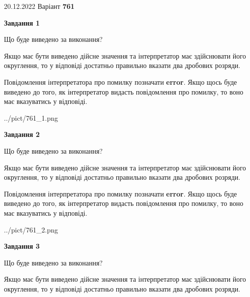 \documentclass[12pt, ukrainian]{article}
\begin{document}
{20.12.2022 Варіант \No \textbf { 761 }\par}
{
\begin {Large}

{\begin {center}\textbf{Завдання 1}\end {center}}\par
Що буде виведено за виконання? \par

Якщо має бути виведено дійсне значення та інтерпретатор має здійснювати його округлення, 
то у відповіді достатньо правильно вказати два дробових розряди.

Повідомлення інтерпретатора про помилку позначати \textbf{error}.
Якщо щось буде виведено до того, як інтерпретатор видасть повідомлення про помилку, 
то воно має вказуватись у відповіді. \par

\begin{center}
	{../pict/761_1.png}
\end{center}
\newpage

{\begin {center}\textbf{Завдання 2}\end {center}}\par
Що буде виведено за виконання? \par

Якщо має бути виведено дійсне значення та інтерпретатор має здійснювати його округлення, 
то у відповіді достатньо правильно вказати два дробових розряди.

Повідомлення інтерпретатора про помилку позначати \textbf{error}.
Якщо щось буде виведено до того, як інтерпретатор видасть повідомлення про помилку, 
то воно має вказуватись у відповіді. \par

\begin{center}
	{../pict/761_2.png}
\end{center}
\newpage

{\begin {center}\textbf{Завдання 3}\end {center}}\par
Що буде виведено за виконання? \par

Якщо має бути виведено дійсне значення та інтерпретатор має здійснювати його округлення, 
то у відповіді достатньо правильно вказати два дробових розряди.


\end{Large}}
\end{document}
